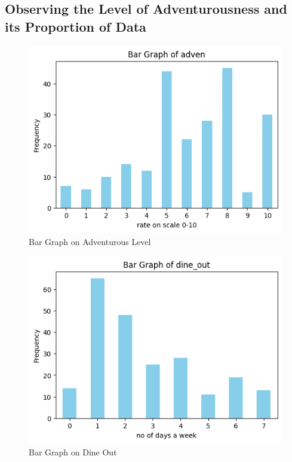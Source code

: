 \documentclass[12pt]{article}
\begin{document}
 \subsection{Observing the Level of Adventurousness and its Proportion of Data}

\begin{figure}[htbp]
    \centering
    \includegraphics[width=1\textwidth]{output_57_0.png} %
    \caption{Bar Graph on Adventurous Level} %
    \label{fig:Dessert_Preferences_1} %
\end{figure}

\begin{figure}[htbp]
    \centering
    \includegraphics[width=1\textwidth]{output_65_0.png} %
    \caption{Bar Graph on Dine Out} %
    \label{fig:Dessert_Preferences_2} %
\end{figure}
\end{document}
